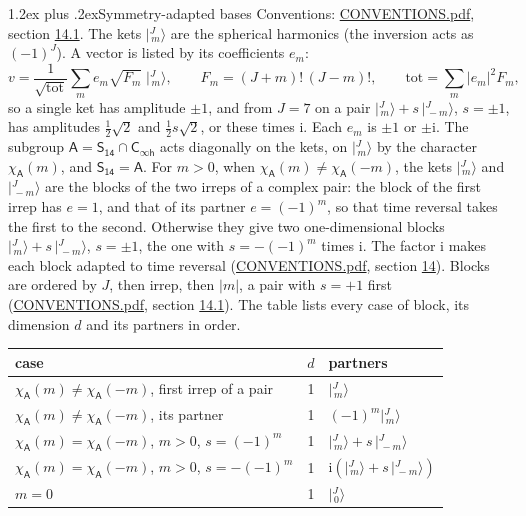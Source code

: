 \documentclass[10pt,a4paper]{article}
\makeatletter
\renewcommand\section{\@startsection{section}{1}{\z@}{-3ex plus -1ex minus -.2ex}%
  {1.2ex plus .2ex}{\normalfont\large\sffamily\bfseries\color{parttitle}}}
\numberwithin{equation}{section}
\newcommand{\grp}[1]{\mathsf{#1}}
\newcommand{\iunit}{\mathrm{i}}
\newcommand{\chiA}{\chi_{\grp{A}}}
\newcommand{\jm}[2]{\bigl\lvert{}^{#1}_{\,#2}\bigr\rangle}
\makeatother
\begin{document}
\section{Symmetry-adapted bases}\label{s:bases}
Conventions: \href{../../CONVENTIONS.pdf}{CONVENTIONS.pdf}, section \href{../../CONVENTIONS.pdf\#conv.14.1}{14.1}.
\leavevmode\label{n:index.m}\label{n:vector.ket}The kets $\jm{J}{m}$ are the spherical harmonics (the inversion acts as $(-1)^J$). \label{n:index.ketcoefficient}\label{n:vector.basis.symmetry}\label{n:index.ketweight}\label{n:index.total}A vector is listed by its coefficients $e_m$:
\begin{equation}\label{e:ket}v = \frac{1}{\sqrt{\mathrm{tot}}}\sum_m e_m\sqrt{F_m}\;\jm{J}{m},\qquad F_m = (J+m)!\,(J-m)!,\qquad \mathrm{tot} = \sum_m |e_m|^2F_m,\end{equation}
\leavevmode\label{n:index.pair.sign}so a single ket has amplitude $\pm1$, and from $J = 7$ on a pair $\jm{J}{m} + s\,\jm{J}{-m}$, $s = \pm1$, has amplitudes $\tfrac{1}{2}\sqrt{2}$ and $\tfrac{1}{2}s\sqrt{2}$, or these times $\iunit$. Each $e_m$ is $\pm1$ or $\pm\iunit$.
\leavevmode\label{n:group.A}\label{n:function.character.abelian}The subgroup $\grp{A} = \grp{S_{14}}\cap\grp{C_{\infty h}}$ acts diagonally on the kets, on $\jm{J}{m}$ by the character $\chiA(m)$, and $\grp{S_{14}} = \grp{A}$. For $m > 0$, when $\chiA(m) \ne \chiA(-m)$, the kets $\jm{J}{m}$ and $\jm{J}{-m}$ are the blocks of the two irreps of a complex pair: the block of the first irrep has $e = 1$, and that of its partner $e = (-1)^m$, so that time reversal takes the first to the second. Otherwise they give two one-dimensional blocks $\jm{J}{m} + s\,\jm{J}{-m}$, $s = \pm1$, the one with $s = -(-1)^m$ times $\iunit$. The factor $\iunit$ makes each block adapted to time reversal (\href{../../CONVENTIONS.pdf}{CONVENTIONS.pdf}, section \href{../../CONVENTIONS.pdf\#conv.14}{14}). Blocks are ordered by $J$, then irrep, then $|m|$, a pair with $s = +1$ first (\href{../../CONVENTIONS.pdf}{CONVENTIONS.pdf}, section \href{../../CONVENTIONS.pdf\#conv.14.1}{14.1}).
\leavevmode\label{n:head.case}\label{n:head.partners}The table lists every case of block, its dimension $d$ and its partners in order.
\begin{center}\begin{tabular}{@{}lrl@{}}\toprule
case & $d$ & partners\\\midrule
$\chiA(m) \ne \chiA(-m)$, first irrep of a pair & 1 & $\jm{J}{m}$\\
$\chiA(m) \ne \chiA(-m)$, its partner & 1 & $(-1)^m\jm{J}{m}$\\
$\chiA(m) = \chiA(-m)$, $m > 0$, $s = (-1)^m$ & 1 & $\jm{J}{m} + s\,\jm{J}{-m}$\\
$\chiA(m) = \chiA(-m)$, $m > 0$, $s = -(-1)^m$ & 1 & $\iunit(\jm{J}{m} + s\,\jm{J}{-m})$\\
$m = 0$ & 1 & $\jm{J}{0}$\\
\bottomrule\end{tabular}\end{center}
\end{document}
